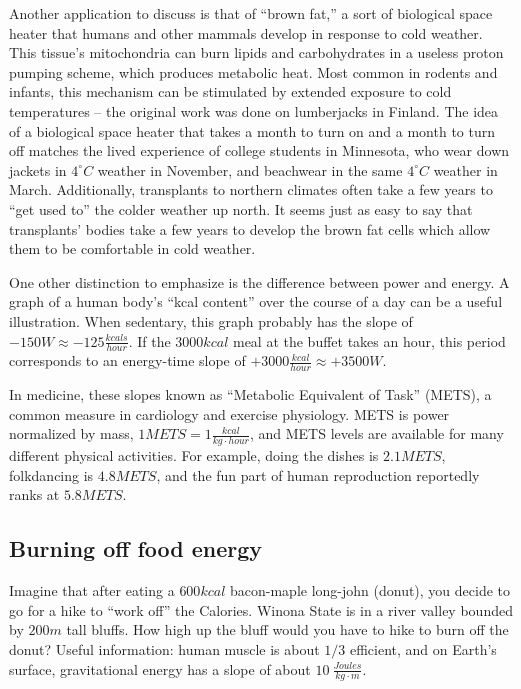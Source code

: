 \documentclass[onecolumn]{article}
\newcommand{\degC}{^{\circ}C}
\begin{document}
Another application to discuss is that of ``brown fat,'' a sort of biological space heater that humans and other mammals develop in response to cold weather.  This tissue's mitochondria can burn lipids and carbohydrates in a useless proton pumping scheme, which produces metabolic heat. 
\cite{brown_fat_3,
brown_fat_1,
brown_fat_4,
brown_fat_2}
Most common in rodents and infants, this mechanism can be stimulated by extended exposure to cold temperatures -- the original work was done on lumberjacks in Finland.
\cite{finland_lumberjacks}
The idea of a biological space heater that takes a month to turn on and a month to turn off matches the lived experience of college students in Minnesota, who wear down jackets in $4\degC$ weather in November, and beachwear in the same $4\degC$ weather in March.  Additionally, transplants to northern climates often take a few years to ``get used to'' the colder weather up north. It seems just as easy to say that transplants' bodies take a few years to develop the brown fat cells which allow them to be comfortable in cold weather.

One other distinction to emphasize is the difference between power and energy.  A graph of a human body's ``kcal content'' over the course of a day can be a useful illustration.  When sedentary, this graph probably has the slope of $-150W\approx -125 \frac{kcals}{hour}$.  If the $3000kcal$ meal at the buffet takes an hour, this period corresponds to an energy-time slope of 
$+3000\frac{kcal}{hour}\approx +3500W$.  

In medicine, these slopes known as ``Metabolic Equivalent of Task'' (METS), a common measure in cardiology and exercise physiology.  METS is power normalized by mass, $1METS=1\frac{kcal}{kg\cdot hour}$, and METS levels are available for many different physical activities. \cite{METS} For example, doing the dishes is $2.1METS$, folkdancing is $4.8METS$, and the fun part of human reproduction reportedly ranks at $5.8METS$. \cite{the_fun_part}

\subsection{Burning off food energy}
Imagine that after eating a $600kcal$ bacon-maple long-john (donut), you decide to go for a hike to ``work off'' the Calories.  
Winona State  is in a river valley bounded by $200m$ tall bluffs.  How high up the bluff would you have to hike to burn off the donut?  
Useful information: human muscle is about $1/3$ efficient, and on Earth's surface, gravitational energy has a slope of about $10~\frac{Joules}{kg\cdot m}$.
\end{document}

